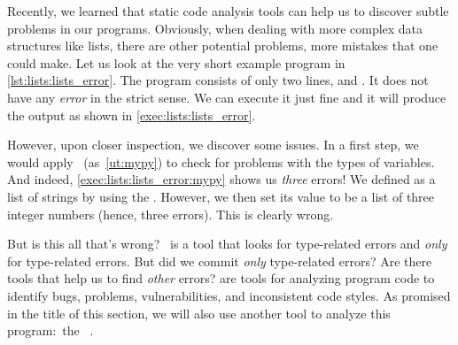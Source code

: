 %
\label{sec:listExampleForErrorsAndRuff}%
%
%
%
%
%
%
%
\begin{sloppypar}%
Recently, we learned that static code analysis tools can help us to discover subtle problems in our programs.
Obviously, when dealing with more complex data structures like lists, there are other potential problems, more mistakes that one could make.
Let us look at the very short example program  in \cref{lst:lists:lists_error}.
The program consists of only two lines,  and .
It does not have any \emph{error} in the strict sense.
We can execute it just fine and it will produce the output \textil{[1, 2, 3]} as shown in \cref{exec:lists:lists_error}.%
\end{sloppypar}%
%
However, upon closer inspection, we discover some issues.
In a first step, we would apply \mypy~(as~\cref{ut:mypy}) to check for problems with the types of variables.
And indeed, \cref{exec:lists:lists_error:mypy} shows us \emph{three} errors!
We defined  as a list of strings by using the  .
However, we then set its value to be a list of three integer numbers (hence, three errors).
This is clearly wrong.

But is this all that's wrong?
\mypy~is a tool that looks for type-related errors and \emph{only} for type-related errors.
But did we commit \emph{only} type-related errors?
Are there tools that help us to find \emph{other} errors?
 are tools for analyzing program code to identify bugs, problems, vulnerabilities, and inconsistent code styles.
As promised in the title of this section, we will also use another tool to analyze this program:~the ~\ruff.

